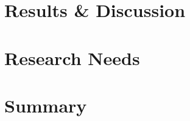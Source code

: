 \documentclass[12pt,oneside]{book}
\begin{document}
\chapter{Results \& Discussion}



\chapter{Research Needs}


\chapter{Summary}




\clearpage

\appendix
\captionsetup{list=no}
\end{document}
